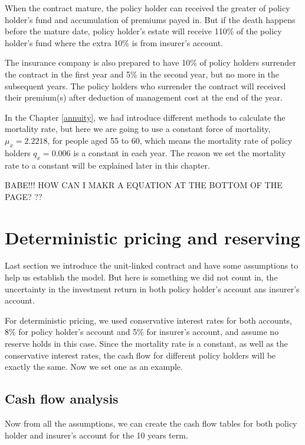 \documentclass{report}
\begin{document}
When the contract mature, the policy holder can received the greater of policy holder's fund and accumulation of premiums payed in. But if the death happens before the mature date, policy holder's estate will receive 110\% of the policy holder's fund where the extra 10\% is from insurer's account.

The insurance company is also prepared to have 10\% of policy holders surrender the contract in the first year and 5\% in the second year, but no more in the subsequent years. The policy holders who surrender the contract will received their premium(s) after deduction of management cost at the end of the year.

In the Chapter \ref{annuity}, we had introduce different methods to calculate the mortality rate, but here we are going to use a constant force of mortality, $\mu_x=2.2218$, for people aged 55 to 60, which means the mortality rate of policy holders $q_x=0.006$ is a constant in each year. The reason we set the mortality rate to a constant will be explained later in this chapter.  

BABE!!! HOW CAN I MAKR A EQUATION AT THE BOTTOM OF THE PAGE? ??



\section{Deterministic pricing and reserving}

Last section we introduce the unit-linked contract and have some assumptions to help us establish the model. But here is something we did not count in, the uncertainty in the investment return in both policy holder's account ans insurer's account. 

For deterministic pricing, we used conservative interest rates for both accounts, 8\% for policy holder's account and 5\% for insurer's account, and assume no reserve holds in this case. Since the mortality rate is a constant, as well as the conservative interest rates, the cash flow for different policy holders will be exactly the same. Now we set one as an example.

\subsection{Cash flow analysis}

Now from all the assumptions, we can create the cash flow tables for both policy holder and insurer's account for the  10 years term. 
\end{document}
